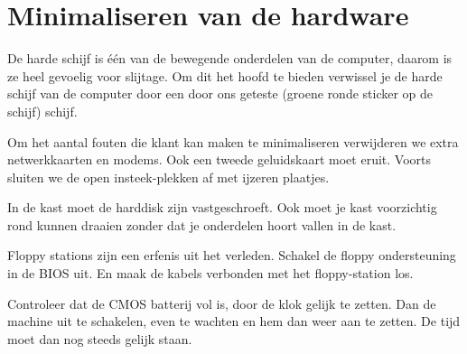 \section{Minimaliseren van de hardware}
De harde schijf is \'{e}\'{e}n van de bewegende onderdelen van de computer, daarom is ze heel gevoelig voor slijtage. Om dit het hoofd te bieden verwissel je de harde schijf van de computer door een door ons geteste (groene ronde sticker op de schijf) schijf.

Om het aantal fouten die klant kan maken te minimaliseren verwijderen we extra netwerkkaarten en modems. Ook een tweede geluidskaart moet eruit. Voorts sluiten we de open insteek-plekken af met ijzeren plaatjes.

In de kast moet de harddisk zijn vastgeschroeft.
Ook moet je kast voorzichtig rond kunnen draaien zonder dat je onderdelen hoort vallen in de kast. 

Floppy stations zijn een erfenis uit het verleden. Schakel de floppy ondersteuning in de BIOS uit. En maak de kabels verbonden met het floppy-station los.

Controleer dat de CMOS batterij vol is, door de klok gelijk te zetten. Dan de machine uit te schakelen, even te wachten en hem dan weer aan te zetten. De tijd moet dan nog steeds gelijk staan.


